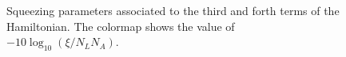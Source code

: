 \begin{figure}
\begin{minipage}{.91\linewidth}
\centering
{}
\end{minipage}
\par\medskip
\begin{minipage}{.91\linewidth}
\centering
{}
\end{minipage}
\caption{Squeezing parameters associated to the third and forth terms of the Hamiltonian. The colormap shows the value of $ -10\log_{10}(\xi/N_LN_A) $. }
\label{fig:squeezingparaTerms}
\end{figure}

